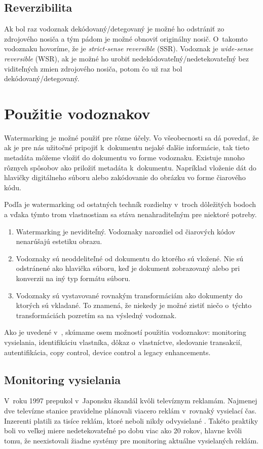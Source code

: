 \subsection{Reverzibilita}
Ak bol raz vodoznak dekódovaný/detegovaný je možné ho odstrániť zo zdrojového nosiča a tým pádom je možné obnoviť originálny nosič. O~takomto vodoznaku hovoríme, že je {\it strict-sense reversible} (SSR). Vodoznak je {\it wide-sense reversible} (WSR), ak je možné ho urobiť nedekódovateľný/nedetekovateľný bez viditeľných zmien zdrojového nosiča, potom čo už raz bol dekódovaný/detegovaný. \cite{Barni}

\section{Použitie vodoznakov}
Watermarking je možné použiť pre rôzne účely. Vo všeobecnosti sa dá povedať, že ak je pre nás užitočné pripojiť k~dokumentu nejaké ďalšie informácie, tak tieto metadáta môžeme vložiť do dokumentu vo forme vodoznaku. Existuje mnoho rôznych spôsobov ako priložiť metadáta k~dokumentu. Napríklad vloženie dát do hlavičky digitálneho súboru alebo zakódovanie do obrázku vo forme čiarového kódu.

Podľa \cite{Cox} je watermarking od ostatných techník rozdielny v~troch dôležitých bodoch a vďaka týmto trom vlastnostiam sa stáva nenahraditeľným pre niektoré potreby.
\begin{enumerate}
    \item Watermarking je neviditeľný. Vodoznaky narozdiel od čiarových kódov nenarúšajú estetiku obrazu.
    \item Vodoznaky sú neoddeliteľné od dokumentu do ktorého sú vložené. Nie sú odstránené ako hlavička súboru, keď je dokument zobrazovaný alebo pri konverzii na iný typ formátu súboru.
    \item Vodoznaky sú vystavované rovnakým transformáciám ako dokumenty do ktorých sú vkladané. To znamená, že niekedy je možné zistiť niečo o~týchto transformáciách pozretím sa na výsledný vodoznak.
\end{enumerate}

Ako je uvedené v~\cite{Cox}, skúmame osem možností použitia vodoznakov: monitoring vysielania, identifikáciu vlastníka, dôkaz o~vlastníctve, sledovanie transakcií, autentifikácia, copy control, device control a legacy enhancements.

\subsection{Monitoring vysielania}
V~roku 1997 prepukol v~Japonsku škandál kvôli televíznym reklamám. Najmenej dve televízne stanice pravidelne plánovali viacero reklám v~rovnaký vysielací čas. Inzerenti platili za tisíce reklám, ktoré neboli nikdy odvysielané \cite{Cox}. Takéto praktiky boli vo veľkej miere nedetekovateľné po dobu viac ako 20 rokov, hlavne kvôli tomu, že neexistovali žiadne systémy pre monitoring aktuálne vysielaných reklám.

